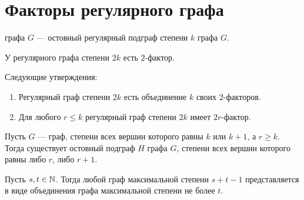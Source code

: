 \section{Факторы регулярного графа}
\begin{definition}[]
	 графа $G$ --- остовный регулярный подграф степени $k$ графа $G$.
\end{definition}

\begin{theorem}[Петерсен, 1891]
	У регулярного графа степени $2k$ есть $2$-фактор.
\end{theorem}
\begin{corollary}[]
	Следующие утверждения:
	\begin{enumerate}
		\item Регулярный граф степени $2k$ есть объединение $k$ своих $2$-факторов.
		\item Для любого $r \le k$ регулярный граф степени $2k$ имеет $2r$-фактор.
	\end{enumerate}
\end{corollary}

\begin{theorem}[Томасен, 1981]
	Пусть $G$ --- граф, степени всех вершин которого равны $k$ или $k+1$, а $r \ge k$. Тогда существует остовный подграф $H$ графа $G$, степени всех вершин которого равны либо $r$, либо $r+1$.
\end{theorem}

\begin{corollary}[Lovasz, 1970]
	Пусть $s, t \in \mathbb{N}$. Тогда любой граф максимальной степени $s + t - 1$ представляется в виде объединения графа максимальной степени не более $t$.
\end{corollary}
